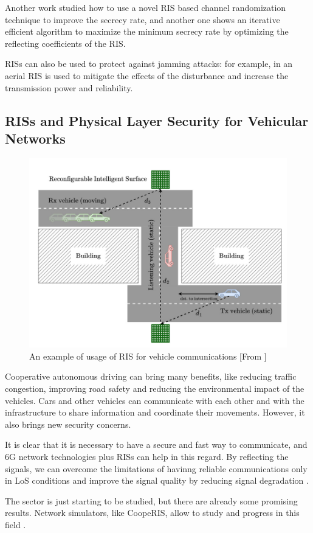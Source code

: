Another work \cite{s21041439} studied how to use a novel RIS based channel randomization technique to improve the secrecy rate, and another one \cite{8742603} shows an iterative efficient algorithm to maximize the minimum secrecy rate by optimizing the reflecting coefficients of the RIS.

RISs can also be used to protect against jamming attacks: for example, in \cite{9424472} an aerial RIS is used to mitigate the effects of the disturbance and increase the transmission power and reliability.

\subsection{RISs and Physical Layer Security for Vehicular Networks}

\begin{figure}[H]
  \centering
  \includegraphics[width=0.5\linewidth]{imgs/RIS vehicles.png}
  \caption{An example of usage of RIS for vehicle communications [From \cite{SEGATA2024110443}]}
\end{figure}

Cooperative autonomous driving can bring many benefits, like reducing traffic congestion, improving road safety and reducing the environmental impact of the vehicles. Cars and other vehicles can communicate with each other and with the infrastructure to share information and coordinate their movements. However, it also brings new security concerns.

It is clear that it is necessary to have a secure and fast way to communicate, and 6G network technologies plus RISs can help in this regard. By reflecting the signals, we can overcome the limitations of havinng reliable communications only in LoS conditions and improve the signal quality by reducing signal degradation \cite{10715713}.

The sector is just starting to be studied, but there are already some promising results. Network simulators, like CoopeRIS, allow to study and progress in this field \cite{SEGATA2024110443}.

